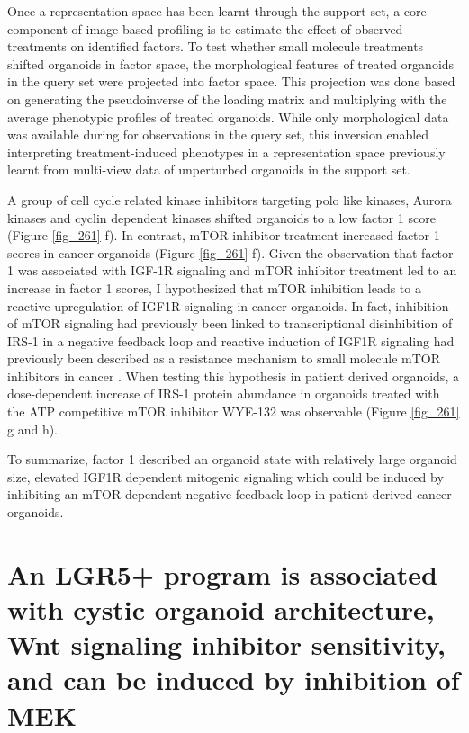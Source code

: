\begin{flushleft}
\bigbreak
Once a representation space has been learnt through the support set, a core component of image based profiling is to estimate the effect of observed treatments on identified factors. To test whether small molecule treatments shifted organoids in factor space, the morphological features of treated organoids in the query set were projected into factor space. This projection was done based on generating the pseudoinverse of the loading matrix and multiplying with the average phenotypic profiles of treated organoids. While only morphological data was available during for observations in the query set, this inversion enabled interpreting treatment-induced phenotypes in a representation space previously learnt from multi-view data of unperturbed organoids in the support set. 

\bigbreak
A group of cell cycle related kinase inhibitors targeting polo like kinases, Aurora kinases and cyclin dependent kinases shifted organoids to a low factor 1 score (Figure \ref{fig_261} f). In contrast, mTOR inhibitor treatment increased factor 1 scores in cancer organoids (Figure \ref{fig_261} f). Given the observation that factor 1 was associated with IGF-1R signaling and mTOR inhibitor treatment led to an increase in factor 1 scores, I hypothesized that mTOR inhibition leads to a reactive upregulation of IGF1R signaling in cancer organoids. In fact, inhibition of mTOR signaling had previously been linked to transcriptional disinhibition of IRS-1 in a negative feedback loop \cite{OReilly2006-fc} and  reactive induction of IGF1R signaling had previously been described as a resistance mechanism to small molecule mTOR inhibitors in cancer \cite{Sharma2010-qa}. When testing this hypothesis in patient derived organoids, a dose-dependent increase of IRS-1 protein abundance in organoids treated with the ATP competitive mTOR inhibitor WYE-132 was observable (Figure \ref{fig_261} g and h). 

\bigbreak
To summarize, factor 1 described an organoid state with relatively large organoid size, elevated IGF1R dependent mitogenic signaling which could be induced by inhibiting an mTOR dependent negative feedback loop in patient derived cancer organoids.

\newpage
\section{An LGR5+ program is associated with cystic organoid architecture, Wnt signaling inhibitor sensitivity, and can be induced by inhibition of MEK}


\end{flushleft}
